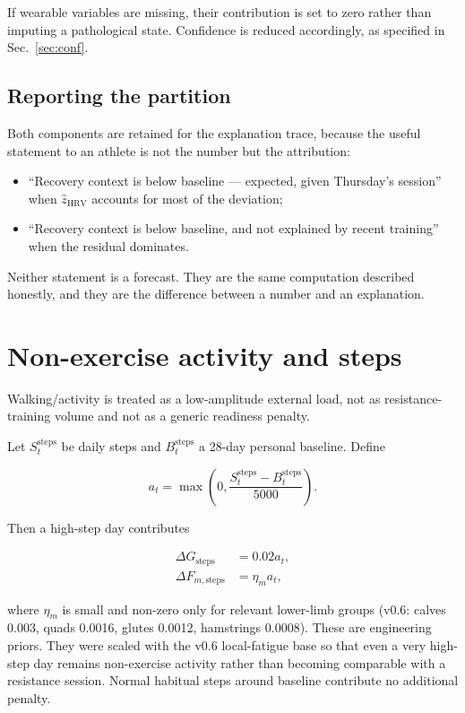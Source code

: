 \documentclass[11pt]{article}
\begin{document}
If wearable variables are missing, their contribution is set to zero rather than imputing a pathological state. Confidence is reduced accordingly, as specified in Sec.~\ref{sec:conf}.

\subsection{Reporting the partition}

Both components are retained for the explanation trace, because the useful statement to an athlete is not the number but the attribution:

\begin{itemize}
    \item ``Recovery context is below baseline --- expected, given Thursday's session'' when $\hat z_{\mathrm{HRV}}$ accounts for most of the deviation;
    \item ``Recovery context is below baseline, and not explained by recent training'' when the residual dominates.
\end{itemize}

Neither statement is a forecast. They are the same computation described honestly, and they are the difference between a number and an explanation.

\section{Non-exercise activity and steps}
\label{sec:steps}

Walking/activity is treated as a low-amplitude external load, not as resistance-training volume and not as a generic readiness penalty.

Let $S_t^{\mathrm{steps}}$ be daily steps and $B_t^{\mathrm{steps}}$ a 28-day personal baseline. Define

\begin{equation}
a_t=\max\left(0,\frac{S_t^{\mathrm{steps}}-B_t^{\mathrm{steps}}}{5000}\right).
\end{equation}

Then a high-step day contributes

\begin{align}
\Delta G_{\mathrm{steps}}&=0.02a_t,\\
\Delta F_{m,\mathrm{steps}}&=\eta_m a_t,
\end{align}

where $\eta_m$ is small and non-zero only for relevant lower-limb groups (v0.6: calves 0.003, quads 0.0016, glutes 0.0012, hamstrings 0.0008). These are engineering priors. They were scaled with the v0.6 local-fatigue base so that even a very high-step day remains non-exercise activity rather than becoming comparable with a resistance session. Normal habitual steps around baseline contribute no additional penalty.
\end{document}
